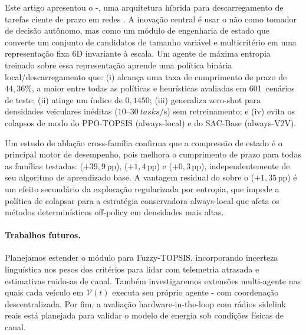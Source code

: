 Este artigo apresentou o -, uma arquitetura híbrida para
descarregamento de tarefas ciente de prazo em redes .
A inovação central é usar o  não como tomador de decisão autônomo, mas
como um módulo de engenharia de estado que converte um conjunto de
candidatos de tamanho variável e multicritério em uma representação fixa 6D
invariante à escala.
Um agente  de máxima entropia treinado sobre essa representação aprende uma
política binária local/descarregamento que:
(i) alcança uma taxa de cumprimento de prazo de $44{,}36\%$, a maior entre
todas as políticas  e heurísticas avaliadas em 601~cenários de teste;
(ii) atinge um índice  de $0{,}1450$;
(iii) generaliza zero-shot para densidades veiculares inéditas
($10$–$\SI{30}{tasks\per\second}$) sem retreinamento;
e
(iv) evita os colapsos de modo do PPO-TOPSIS (always-local) e do SAC-Base
(always-V2V).

Um estudo de ablação cross-família confirma que a compressão de estado  é o principal motor de desempenho, pois melhora o cumprimento de prazo para todas as famílias  testadas:  ($+39{,}9$\,pp),  ($+1{,}4$\,pp) e  ($+0{,}3$\,pp), independentemente de seu algoritmo de aprendizado base. A vantagem residual do  sobre o  ($+1{,}35$\,pp) é um efeito secundário da exploração regularizada por entropia, que impede a política de colapsar para a estratégia conservadora always-local que afeta os métodos determinísticos off-policy em densidades mais altas.

\paragraph{Trabalhos futuros.} Planejamos estender o módulo  para Fuzzy-TOPSIS, incorporando incerteza linguística nos pesos dos critérios para lidar com telemetria atrasada e estimativas ruidosas de canal. Também investigaremos extensões multi-agente nas quais cada veículo em $\mathcal{V}(t)$ executa seu próprio agente - com coordenação descentralizada. Por fim, a avaliação hardware-in-the-loop com rádios sidelink  reais está planejada para validar o modelo de energia sob condições físicas de canal. 
